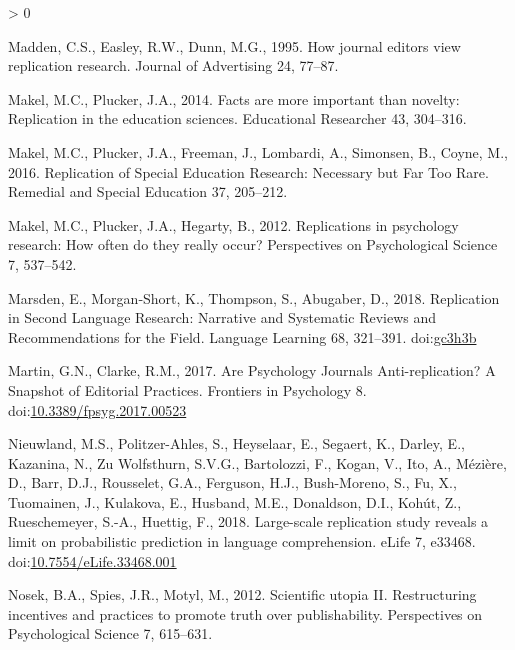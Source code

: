 \documentclass[]{elsarticle} %
\newlength{\cslhangindent}
\newenvironment{CSLReferences}[2] %
 {%
  \setlength{\parindent}{0pt}
  \ifodd #1 \everypar{\setlength{\hangindent}{\cslhangindent}}\ignorespaces\fi
  \ifnum #2 > 0
  \setlength{\parskip}{#2\baselineskip}
  \fi
 }%
 {}
\begin{document}
\begin{CSLReferences}{1}{0}
\leavevmode\hypertarget{ref-madden_how_1995}{}%
Madden, C.S., Easley, R.W., Dunn, M.G., 1995. How journal editors view
replication research. Journal of Advertising 24, 77--87.

\leavevmode\hypertarget{ref-makel_facts_2014}{}%
Makel, M.C., Plucker, J.A., 2014. Facts are more important than novelty:
{Replication} in the education sciences. Educational Researcher 43,
304--316.

\leavevmode\hypertarget{ref-makel_replication_2016}{}%
Makel, M.C., Plucker, J.A., Freeman, J., Lombardi, A., Simonsen, B.,
Coyne, M., 2016. Replication of {Special} {Education} {Research}:
{Necessary} but {Far} {Too} {Rare}. Remedial and Special Education 37,
205--212.

\leavevmode\hypertarget{ref-makel_replications_2012}{}%
Makel, M.C., Plucker, J.A., Hegarty, B., 2012. Replications in
psychology research: {How} often do they really occur? Perspectives on
Psychological Science 7, 537--542.

\leavevmode\hypertarget{ref-marsden_replication_2018}{}%
Marsden, E., Morgan‐Short, K., Thompson, S., Abugaber, D., 2018.
Replication in {Second} {Language} {Research}: {Narrative} and
{Systematic} {Reviews} and {Recommendations} for the {Field}. Language
Learning 68, 321--391. doi:\href{https://doi.org/gc3h3b}{gc3h3b}

\leavevmode\hypertarget{ref-martin_are_2017}{}%
Martin, G.N., Clarke, R.M., 2017. Are {Psychology} {Journals}
{Anti}-replication? {A} {Snapshot} of {Editorial} {Practices}. Frontiers
in Psychology 8.
doi:\href{https://doi.org/10.3389/fpsyg.2017.00523}{10.3389/fpsyg.2017.00523}

\leavevmode\hypertarget{ref-nieuwland_large-scale_2018}{}%
Nieuwland, M.S., Politzer-Ahles, S., Heyselaar, E., Segaert, K., Darley,
E., Kazanina, N., Zu Wolfsthurn, S.V.G., Bartolozzi, F., Kogan, V., Ito,
A., Mézière, D., Barr, D.J., Rousselet, G.A., Ferguson, H.J.,
Bush-Moreno, S., Fu, X., Tuomainen, J., Kulakova, E., Husband, M.E.,
Donaldson, D.I., Kohút, Z., Rueschemeyer, S.-A., Huettig, F., 2018.
Large-scale replication study reveals a limit on probabilistic
prediction in language comprehension. eLife 7, e33468.
doi:\href{https://doi.org/10.7554/eLife.33468.001}{10.7554/eLife.33468.001}

\leavevmode\hypertarget{ref-nosek_scientific_2012}{}%
Nosek, B.A., Spies, J.R., Motyl, M., 2012. Scientific utopia {II}.
{Restructuring} incentives and practices to promote truth over
publishability. Perspectives on Psychological Science 7, 615--631.


\end{CSLReferences}
\end{document}
